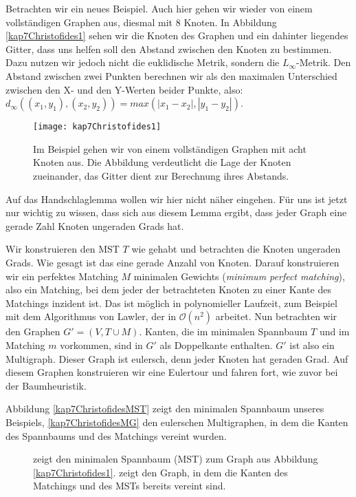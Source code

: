 Betrachten wir ein neues Beispiel. Auch hier gehen wir wieder von einem vollständigen Graphen aus, diesmal mit 8 Knoten. In Abbildung \vref{kap7Christofides1} sehen wir die Knoten des Graphen und ein dahinter liegendes Gitter, dass uns helfen soll den Abstand zwischen den Knoten zu bestimmen. Dazu nutzen wir jedoch nicht die euklidische Metrik, sondern die $L_{\infty}$-Metrik. Den Abstand zwischen zwei Punkten berechnen wir als den maximalen Unterschied zwischen den X- und den Y-Werten beider Punkte, also: $d_{\infty}((x_1, y_1), (x_2, y_2)) = max(|x_1 - x_2|, |y_1 - y_2|)$.

\begin{figure}[htb]
  \centering
  \texttt{[image: kap7Christofides1]}
  \caption{Im Beispiel gehen wir von einem vollständigen Graphen mit acht Knoten aus. Die Abbildung verdeutlicht die Lage der Knoten zueinander, das Gitter dient zur Berechnung ihres Abstands.}
  \label{kap7Christofides1}
\end{figure}

Auf das Handschlaglemma wollen wir hier nicht näher eingehen. Für uns ist jetzt nur wichtig zu wissen, dass sich aus diesem Lemma ergibt, dass jeder Graph eine gerade Zahl Knoten ungeraden Grads hat.

Wir konstruieren den MST $T$ wie gehabt und betrachten die Knoten ungeraden Grads. Wie gesagt ist das eine gerade Anzahl von Knoten. Darauf konstruieren wir ein perfektes Matching $M$ minimalen Gewichts (\textit{minimum perfect matching}), also ein Matching, bei dem jeder der betrachteten Knoten zu einer Kante des Matchings inzident ist. Das ist möglich in polynomieller Laufzeit, zum Beispiel mit dem Algorithmus von Lawler, der in $\mathcal{O}(n^2)$ arbeitet. Nun betrachten wir den Graphen $G'=(V, T \cup M)$. Kanten, die im  minimalen Spannbaum $T$ und im Matching $m$ vorkommen, sind in $G'$ als Doppelkante enthalten. $G'$ ist also ein Multigraph. Dieser Graph ist eulersch, denn jeder Knoten hat geraden Grad. Auf diesem Graphen konstruieren wir eine Eulertour und fahren fort, wie zuvor bei der Baumheuristik.

Abbildung \vref{kap7ChristofidesMST} zeigt den minimalen Spannbaum unseres Beispiels, \ref{kap7ChristofidesMG} den eulerschen Multigraphen, in dem die Kanten des Spannbaums und des Matchings vereint wurden.

\begin{figure}[htb]
  \centering
  \hspace{2em}
  \hspace{2em}
  \caption{ zeigt den minimalen Spannbaum (MST) zum Graph aus Abbildung \vref{kap7Christofides1}.  zeigt den Graph, in dem die Kanten des Matchings und des MSTs bereits vereint sind.}
  \label{kap7ChristofidesMSTMG}
\end{figure}

